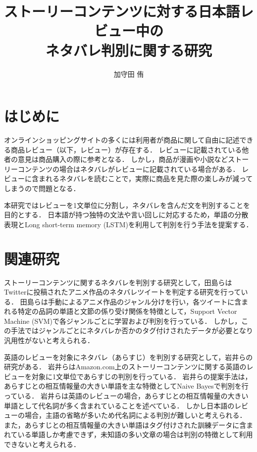 \documentclass[autodetect-engine,dvipdfmx-if-dvi,ja=standard,a4j,jbase=10.5pt,twoside,twocolumn,magstyle=nomag*]{bxjsarticle}
\title{ストーリーコンテンツに対する日本語レビュー中の\\ネタバレ判別に関する研究}
\author{加守田 侑}
\date{}
\begin{document}
\maketitle

\section{はじめに} \label{sec:intro}
オンラインショッピングサイトの多くには利用者が商品に関して自由に記述できる商品レビュー（以下，レビュー）が存在する．
レビューに記載されている他者の意見は商品購入の際に参考となる．
しかし，商品が漫画や小説などストーリーコンテンツの場合はネタバレがレビューに記載されている場合がある．
レビューに含まれるネタバレを読むことで，実際に商品を見た際の楽しみが減ってしまうので問題となる．

本研究ではレビューを1文単位に分割し，ネタバレを含んだ文を判別することを目的とする．
日本語が持つ独特の文法や言い回しに対応するため，単語の分散表現とLong short-term memory (LSTM)\cite{lstm}を利用して判別を行う手法を提案する．

\section{関連研究} \label{sec:kanren}
ストーリーコンテンツに関するネタバレを判別する研究として，田島ら\cite{tazima}はTwitterに投稿されたアニメ作品のネタバレツイートを判定する研究を行っている．
田島らは手動によるアニメ作品のジャンル分けを行い，各ツイートに含まれる特定の品詞の単語と文節の係り受け関係を特徴として，Support Vector Machine (SVM)で各ジャンルごとに学習および判別を行っている．
しかし，この手法ではジャンルごとにネタバレか否かのタグ付けされたデータが必要となり汎用性がないと考えられる．

英語のレビューを対象にネタバレ（あらすじ）を判別する研究として，岩井らの研究\cite{iwai2}がある．
岩井らはAmazon.com上のストーリーコンテンツに関する英語のレビューを対象に1文単位であらすじの判別を行っている．
岩井らの提案手法は，あらすじとの相互情報量の大きい単語を主な特徴としてNaive Bayesで判別を行っている．
岩井らは英語のレビューの場合，あらすじとの相互情報量の大きい単語として代名詞が多く含まれていることを述べている．
しかし日本語のレビューの場合，主語の省略が多いため代名詞による判別が難しいと考えられる．
また，あらすじとの相互情報量の大きい単語はタグ付けされた訓練データに含まれている単語しか考慮できず，未知語の多い文章の場合は判別の特徴として利用できないと考えられる．
\end{document}
